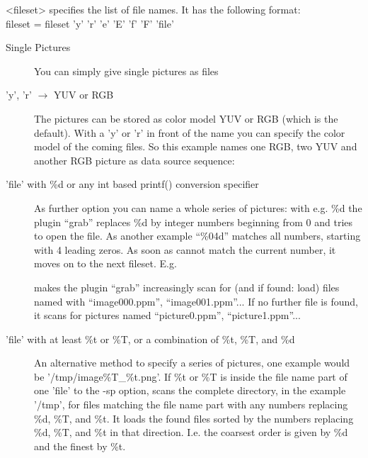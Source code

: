 \begin{description}
  \textless{}fileset\textgreater{} specifies the list of file
  names. It has the following format:\\
  \hspace*{0.9cm}fileset = fileset \textbar{} 'y' \textbar{} 'r'
  \textbar{} 'e' \textbar{} 'E' \textbar{} 'f' \textbar{} 'F' \textbar{} 'file'

  \begin{description} %

  \item [Single Pictures]
    You can simply give single pictures as files
    \sS

  \item['y', 'r' $\rightarrow$ YUV or RGB]
    The pictures can be stored as color model YUV or RGB (which is
    the default). With a 'y' or 'r' in front of the name you
    can specify the color model of the coming files. So this example
    names one RGB, two YUV and another RGB picture as data source
    sequence:
    \sS

  \item['file' with \%d or any int based printf() conversion specifier]
    As further option you can name a whole series of pictures: with
    e.g. \%d the plugin ``grab'' replaces \%d by integer numbers
    beginning from 0 and tries to open the file. As another example
    ``\%04d'' matches all numbers, starting with 4 leading zeros. As
    soon as \icewing{} cannot match the current number, it moves on
    to the next fileset. E.g.

    \sE
    makes the plugin ``grab'' increasingly scan for (and if found:
    load) files named with ``image000.ppm'', ``image001.ppm''... If
    no further file is found, it scans for pictures named
    ``picture0.ppm'', ``picture1.ppm''...

  \item['file' with at least \%t or \%T, or a combination of \%t, \%T, and \%d]
    \label{page:opt_sp_time}
    An alternative method to specify a series of pictures, one
    example would be '/tmp/image\%T\_\%t.png'. If \%t or \%T is
    inside the file name part of one 'file' to the -sp option,
    \icewing{} scans the complete directory, in the example '/tmp',
    for files matching the file name part with any numbers replacing
    \%d, \%T, and \%t. It loads the found files sorted by the
    numbers replacing \%d, \%T, and \%t in that direction. I.e. the
    coarsest order is given by \%d and the finest by \%t.


\end{description}
\end{description}
